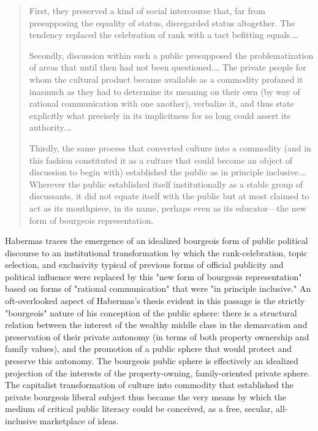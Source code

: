 \blockcquote[36--7]{Habermas1989}{
  First, they preserved a kind of social intercourse that, far from presupposing the equality of status, disregarded status altogether. The tendency replaced the celebration of rank with a tact befitting equals.…

  Secondly, discussion within such a public presupposed the problematization of areas that until then had not been questioned.… The private people for whom the cultural product became available as a commodity profaned it inasmuch as they had to determine its meaning on their own (by way of rational communication with one another), verbalize it, and thus state explicitly what precisely in its implicitness for so long could assert its authority.…

  Thirdly, the same process that converted culture into a commodity (and in this fashion constituted it as a culture that could become an object of discussion to begin with) established the public as in principle inclusive.…Wherever the public established itself institutionally as a stable group of discussants, it did not equate itself with the public but at most claimed to act as its mouthpiece, in its name, perhaps even as its educator---the new form of bourgeois representation.
}
Habermas traces the emergence of an idealized bourgeois form of public political discourse to an institutional transformation by which the rank-celebration, topic selection, and exclusivity typical of previous forms of official publicity and political influence were replaced by this "new form of bourgeois representation" based on forms of "rational communication" that were "in principle inclusive." An oft-overlooked aspect of Habermas's thesis evident in this passage is the strictly "bourgeois" nature of his conception of the public sphere: there is a structural relation between the interest of the wealthy middle class in the demarcation and preservation of their private autonomy (in terms of both property ownership and family values), and the promotion of a public sphere that would protect and preserve this autonomy. The bourgeois public sphere is effectively an idealized projection of the interests of the property-owning, family-oriented private sphere. The capitalist transformation of culture into commodity that established the private bourgeois liberal subject thus became the very means by which the medium of critical public literacy could be conceived, as a free, secular, all-inclusive marketplace of ideas.

